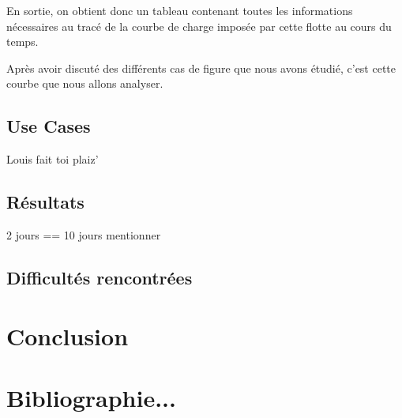 			En sortie, on obtient donc un tableau contenant toutes les informations nécessaires au tracé de la courbe de charge imposée par cette flotte au cours du temps.
			
			Après avoir discuté des différents cas de figure que nous avons étudié, c'est cette courbe que nous allons analyser.
			
		
		
		\clearpage
	\subsection{Use Cases}
		
		 Louis fait toi plaiz'
		
		
	\subsection{Résultats}
	2 jours == 10 jours mentionner
	\subsection{Difficultés rencontrées}
	
\section*{Conclusion}

\section*{Bibliographie...}
		
		
